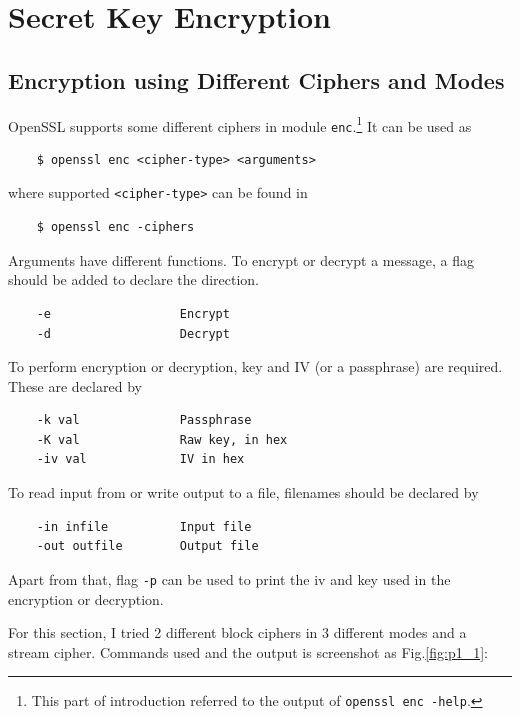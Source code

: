 \section{Secret Key Encryption}

\subsection{Encryption using Different Ciphers and Modes}

OpenSSL supports some different ciphers in module \texttt{enc}.\footnote{This part of introduction referred to the output of \texttt{openssl enc -help}.}
It can be used as 
\begin{verbatim}
    $ openssl enc <cipher-type> <arguments>
\end{verbatim}
where supported \texttt{<cipher-type>} can be found in 
\begin{verbatim}
    $ openssl enc -ciphers
\end{verbatim}

Arguments have different functions. 
To encrypt or decrypt a message, a flag should be added to declare the direction.
\begin{verbatim}
    -e                  Encrypt
    -d                  Decrypt
\end{verbatim}
To perform encryption or decryption, key and IV (or a passphrase) are required. These are declared by 
\begin{verbatim}
    -k val              Passphrase
    -K val              Raw key, in hex
    -iv val             IV in hex
\end{verbatim}
To read input from or write output to a file, filenames should be declared by 
\begin{verbatim}
    -in infile          Input file
    -out outfile        Output file
\end{verbatim}
Apart from that, flag \texttt{-p} can be used to print the iv and key used in the encryption or decryption.

For this section, I tried 2 different block ciphers in 3 different modes and a stream cipher.
Commands used and the output is screenshot as Fig.\ref{fig:p1_1}:

